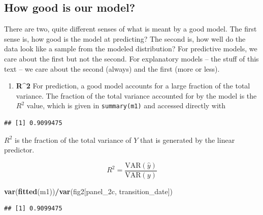 \documentclass[]{book}
\newenvironment{Shaded}{\begin{snugshade}}{\end{snugshade}}
\newcommand{\KeywordTok}[1]{\textcolor[rgb]{0.13,0.29,0.53}{\textbf{#1}}}
\newcommand{\NormalTok}[1]{#1}
\newcommand{\OperatorTok}[1]{\textcolor[rgb]{0.81,0.36,0.00}{\textbf{#1}}}
\providecommand{\tightlist}{%
  \setlength{\itemsep}{0pt}\setlength{\parskip}{0pt}}
\begin{document}
\hypertarget{how-good-is-our-model}{%
\subsection{How good is our model?}\label{how-good-is-our-model}}

There are two, quite different senses of what is meant by a good model. The first sense is, how good is the model at predicting? The second is, how well do the data look like a sample from the modeled distribution? For predictive models, we care about the first but not the second. For explanatory models -- the stuff of this text -- we care about the second (always) and the first (more or less).

\begin{enumerate}
\def\labelenumi{\arabic{enumi}.}
\tightlist
\item
  \textbf{R\^{}2} For prediction, a good model accounts for a large fraction of the total variance. The fraction of the total variance accounted for by the model is the \(R^2\) value, which is given in \texttt{summary(m1)} and accessed directly with
\end{enumerate}

\begin{Shaded}
\end{Shaded}

\begin{verbatim}
## [1] 0.9099475
\end{verbatim}

\(R^2\) is the fraction of the total variance of \(Y\) that is generated by the linear predictor.

\begin{equation}
R^2 = \frac{\mathrm{VAR}(\hat{y})}{\mathrm{VAR}(y)}
\end{equation}

\begin{Shaded}
\begin{Highlighting}[]
\KeywordTok{var}\NormalTok{(}\KeywordTok{fitted}\NormalTok{(m1))}\OperatorTok{/}\KeywordTok{var}\NormalTok{(fig2[panel_2c, transition_date])}
\end{Highlighting}
\end{Shaded}

\begin{verbatim}
## [1] 0.9099475
\end{verbatim}
\end{document}
